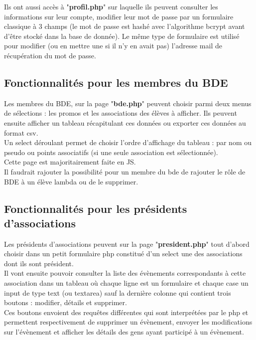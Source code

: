 \documentclass[french]{article}
\begin{document}
	Ils ont aussi accès à "\textbf{profil.php}" sur laquelle ils peuvent consulter les informations sur leur compte, modifier leur mot de passe par un formulaire classique à 3 champs (le mot de passe est hashé avec l'algorithme bcrypt avant d'être stocké dans la base de donnée). Le même type de formulaire est utilisé pour modifier (ou en mettre une si il n'y en avait pas) l'adresse mail de récupération du mot de passe.
	
\subsection{Fonctionnalités pour les membres du BDE}
	Les membres du BDE, sur la page "\textbf{bde.php}" peuvent choisir parmi deux menus de sélections : les promos et les associations des élèves à afficher. Ils peuvent ensuite afficher un tableau récapitulant ces données ou exporter ces données au format csv.\\ Un select déroulant permet de choisir l'ordre d'affichage du tableau : par nom ou pseudo ou points associatifs (si une seule association est sélectionnée).\\
	
	Cette page est majoritairement faite en JS. \\
	
	Il faudrait rajouter la possibilité pour un membre du bde de rajouter le rôle de BDE à un élève lambda ou de le supprimer.

\subsection{Fonctionnalités pour les présidents d'associations}	
	Les présidents d'associations peuvent sur la page "\textbf{president.php}" tout d'abord choisir dans un petit formulaire php constitué d'un select une des associations dont ils sont président.\\
	
	Il vont ensuite pouvoir consulter la liste des évènements correspondants à cette association dans un tableau où chaque ligne est un formulaire et chaque case un input de type text (ou textarea) sauf la dernière colonne qui contient trois boutons : modifier, détails et supprimer.\\
	
	Ces boutons envoient des requêtes différentes qui sont interprétées par le php et permettent respectivement de supprimer un évènement, envoyer les modifications sur l'évènement et afficher les détails des gens ayant participé à un évènement. \\
	
\end{document}
